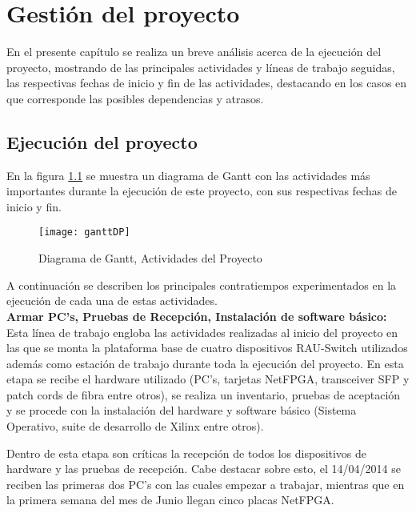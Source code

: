 \chapter{Gestión del proyecto}

\ifpdf
    \graphicspath{{Chapter7/Figs/Raster/}{Chapter7/Figs/PDF/}{Chapter7/Figs/}}
\else
    \graphicspath{{Chapter7/Figs/Vector/}{Chapter7/Figs/}}
\fi

En el presente cap\'itulo se realiza un breve análisis acerca de la ejecuci\'on del proyecto, mostrando de las principales actividades y l\'ineas de trabajo seguidas, las respectivas fechas de inicio y fin de las actividades, destacando en los casos en que corresponde las posibles dependencias y atrasos.

\section{Ejecuci\'on del proyecto}

En la figura \ref{fig:gantt} se muestra un diagrama de Gantt con las actividades m\'as importantes durante la ejecuci\'on de este proyecto, con sus respectivas fechas de inicio y fin.

\begin{figure}[h!] 
\centering    
\texttt{[image: ganttDP]}
\caption[Diagrama de Gantt, Actividades del Proyecto]{Diagrama de Gantt, Actividades del Proyecto}
\label{fig:gantt}
\end{figure}

A continuaci\'on se describen los principales contratiempos experimentados en la ejecuci\'on de cada una de estas actividades.\\

\textbf{Armar PC's, Pruebas de Recepción, Instalación de software b\'asico:} Esta l\'inea de trabajo engloba las actividades realizadas al inicio del proyecto en las que se monta la plataforma base de cuatro dispositivos RAU-Switch utilizados adem\'as como estaci\'on de trabajo durante toda la ejecuci\'on del proyecto. En esta etapa se recibe el hardware utilizado (PC's, tarjetas NetFPGA, transceiver SFP y patch cords de fibra entre otros), se realiza un inventario, pruebas de aceptaci\'on y se procede con la instalaci\'on del hardware y software b\'asico (Sistema Operativo, suite de desarrollo de Xilinx entre otros).

Dentro de esta etapa son cr\'iticas la recepci\'on de todos los dispositivos de hardware y las pruebas de recepci\'on. Cabe destacar sobre esto, el 14/04/2014 se reciben las primeras dos PC's con las cuales empezar a trabajar, mientras que en la primera semana del mes de Junio llegan cinco placas NetFPGA.\\

